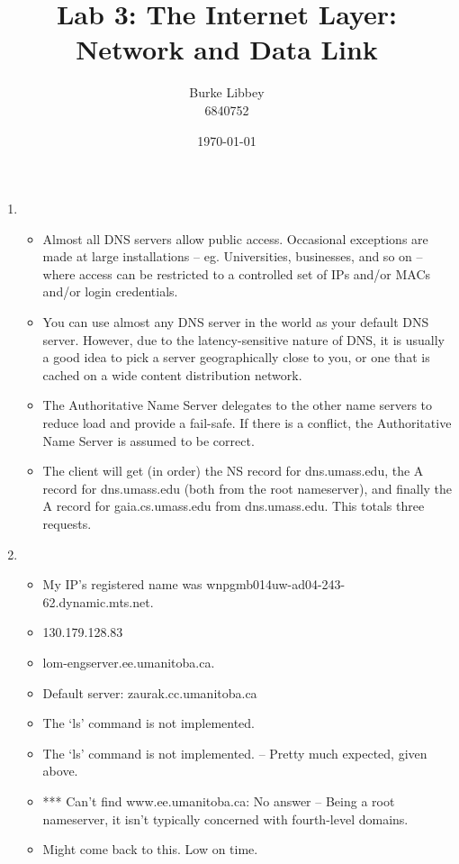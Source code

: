 \documentclass[10pt,letterpaper,titlepage]{article}
\begin{document}
\author{Burke Libbey \\ 6840752}
\title{Lab 3: The Internet Layer: \\ Network and Data Link}
\date{\today}

\maketitle

\begin{enumerate}
\item \begin{itemize}
  \item Almost all DNS servers allow public access. Occasional exceptions are made at large installations -- eg. Universities, businesses, and so on -- where access can be restricted to a controlled set of IPs and/or MACs and/or login credentials.
  \item You can use almost any DNS server in the world as your default DNS server. However, due to the latency-sensitive nature of DNS, it is usually a good idea to pick a server geographically close to you, or one that is cached on a wide content distribution network.
  \item The Authoritative Name Server delegates to the other name servers to reduce load and provide a fail-safe. If there is a conflict, the Authoritative Name Server is assumed to be correct.
  \item The client will get (in order) the NS record for dns.umass.edu, the A record for dns.umass.edu (both from the root nameserver), and finally the A record for gaia.cs.umass.edu from dns.umass.edu. This totals three requests.
\end{itemize}
\item \begin{itemize}
  \item My IP's registered name was wnpgmb014uw-ad04-243-62.dynamic.mts.net.
  \item 130.179.128.83
  \item lom-engserver.ee.umanitoba.ca.
  \item Default server: zaurak.cc.umanitoba.ca
  \item The `ls' command is not implemented.
  \item The `ls' command is not implemented. -- Pretty much expected, given above.
  \item *** Can't find www.ee.umanitoba.ca: No answer -- Being a root nameserver, it isn't typically concerned with fourth-level domains.
  \item Might come back to this. Low on time.

\end{itemize}
\end{enumerate}
\end{document}
